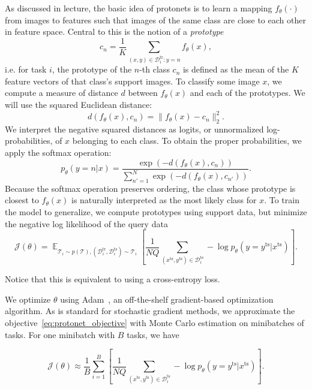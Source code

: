 \documentclass[12pt]{article}
\DeclareMathOperator{\E}{\mathbb{E}}
\newcommand{\task}{\mathcal{T}}
\newcommand{\supportdata}{\mathcal{D}^\mathrm{tr}}
\newcommand{\querydata}{\mathcal{D}^\mathrm{ts}}
\newcommand{\query}[1]{{#1}^\mathrm{ts}}
\begin{document}
As discussed in lecture, the basic idea of protonets is to learn a mapping $f_\theta(\cdot)$ from images to features such that images of the same class are close to each other in feature space. Central to this is the notion of a \emph{prototype}
\begin{equation}
    c_n = \frac{1}{K} \sum_{(x,y) \in \supportdata_i : y = n} f_\theta(x),
\end{equation}
i.e. for task $i$, the prototype of the $n$-th class $c_n$ is defined as the mean of the $K$ feature vectors of that class's support images.
To classify some image $x$, we compute a measure of distance $d$ between $f_\theta(x)$ and each of the prototypes. We will use the squared Euclidean distance:
\begin{equation}
    d(f_\theta(x), c_n) = \lVert f_\theta(x) - c_n \rVert_2^2.
\end{equation}
We interpret the negative squared distances as logits, or unnormalized log-probabilities, of $x$ belonging to each class. To obtain the proper probabilities, we apply the softmax operation:
\begin{equation}
    p_\theta(y=n|x) = \frac{\exp(-d(f_\theta(x), c_n))}{\sum_{n'=1}^N \exp(-d(f_\theta(x), c_{n'}))}.
\end{equation}
Because the softmax operation preserves ordering, the class whose prototype is closest to $f_\theta(x)$ is naturally interpreted as the most likely class for $x$. To train the model to generalize, we compute prototypes using support data, but minimize the negative log likelihood of the query data
\begin{equation}
    \mathcal{J}(\theta) = \E_{\task_i \sim p(\task), (\supportdata_i, \querydata_i) \sim \task_i} \left[ \frac{1}{NQ} \sum_{(\query{x},\query{y}) \in \querydata_i} - \log p_\theta(y = \query{y} | \query{x}) \right].
    \label{eq:protonet_objective}
\end{equation}

Notice that this is equivalent to using a cross-entropy loss.

We optimize $\theta$ using Adam~\cite{kingma2014adam}, an off-the-shelf gradient-based optimization algorithm.
As is standard for stochastic gradient methods, we approximate the objective~\eqref{eq:protonet_objective} with Monte Carlo estimation on minibatches of tasks. For one minibatch with $B$ tasks, we have

\begin{equation}
    \mathcal{J}(\theta) \approx \frac{1}{B} \sum_{i=1}^B 
     \left[ \frac{1}{NQ} \sum_{(\query{x},\query{y}) \in \querydata_i} - \log p_\theta(y = \query{y} | \query{x}) \right].
    \label{eq:protonet_objective_minibatch}
\end{equation}
\end{document}
